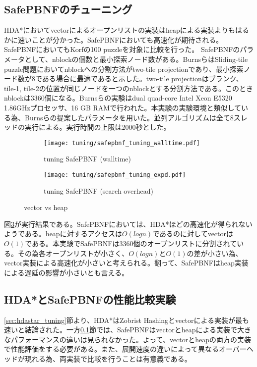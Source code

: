 \documentclass[uplatex]{jsarticle}
\begin{document}
\subsection{SafePBNFのチューニング}
\label{sec:pbnf_tuning}

HDA*においてvectorによるオープンリストの実装はheapによる実装よりもはるかに速いことが分かった。SafePBNFにおいても高速化が期待される。SafePBNFにおいてもKorfの100 puzzleを対象に比較を行った。
SafePBNFのパラメータとして、nblockの個数と最小探索ノード数がある。BurnsらはSliding-tile puzzle問題においてnblockへの分割方法がtwo-tile projectionであり、最小探索ノード数が8である場合に最適であると示した。two-tile projectionはブランク、tile-1, tile-2の位置が同じノードを一つのnblockとする分割方法である。このときnblockは3360個になる。Burnsらの実験はdual quad-core Intel Xeon E5320 1.86GHzプロセッサ、16 GB RAMで行われた。本実験の実験環境と類似している為、Burnsらの提案したパラメータを用いた。並列アルゴリズムは全て8スレッドの実行による。実行時間の上限は2000秒とした。
\newline

\begin{figure}[h]
	\centering
	\begin{subfigure}{0.4\columnwidth}
		\texttt{[image: tuning/safepbnf\_tuning\_walltime.pdf]}
		\caption{tuning SafePBNF (walltime)}
		\label{fig:safepbnf_tuning_walltime}
	\end{subfigure}
	\begin{subfigure}{0.4\columnwidth}
		\texttt{[image: tuning/safepbnf\_tuning\_expd.pdf]}
		\caption{tuning SafePBNF (search overhead)}
		\label{fig:safepbnf_tuning_expd}
	\end{subfigure}
	\label{fig:safepbnf_tuning}
	\caption{vector vs heap}
\end{figure}

図\ref{fig:safepbnf_tuning}が実行結果である。SafePBNFにおいては、HDA*ほどの高速化が得られないようである。heapに対するアクセスは$O(logn)$であるのに対してvectorは$O(1)$である。本実験でSafePBNFは3360個のオープンリストに分割されている。その為各オープンリストが小さく、$O(logn)$と$O(1)$の差が小さい為、vector実装による高速化が小さいと考えられる。翻って、SafePBNFはheap実装による遅延の影響が小さいとも言える。

\subsection{HDA*とSafePBNFの性能比較実験}

\ref{sec:hdastar_tuning}節より、HDA*はZobrist Hashingとvectorによる実装が最も速いと結論された。一方\ref{sec:pbnf_tuning}節では、SafePBNFはvectorとheapによる実装で大きなパフォーマンスの違いは見られなかった。よって、vectorとheapの両方の実装で性能評価をする必要がある。また、展開速度の違いによって異なるオーバーヘッドが現れる為、両実装で比較を行うことは有意義である。
\end{document}
